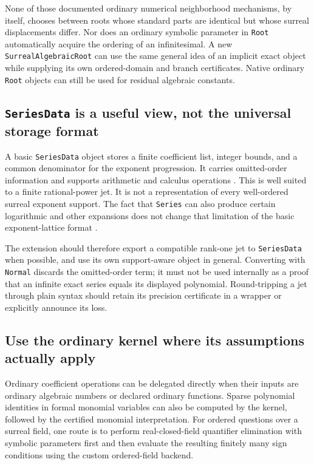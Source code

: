 \documentclass[11pt,letterpaper]{article}
\numberwithin{equation}{section}
\theoremstyle{definition}
\theoremstyle{remark}\newtheorem{remark}[theorem]{Remark}
\begin{document}
None of those documented ordinary numerical neighborhood mechanisms, by
itself, chooses between roots whose standard parts are identical but whose
surreal displacements differ. Nor does an ordinary symbolic parameter in
\texttt{Root} automatically acquire the ordering of an infinitesimal.
A new \texttt{SurrealAlgebraicRoot} can use the same general idea of an
implicit exact object while supplying its own ordered-domain and branch
certificates. Native ordinary \texttt{Root} objects can still be used for
residual algebraic constants.

\subsection{\texttt{SeriesData} is a useful view, not the universal storage format}
A basic \texttt{SeriesData} object stores a finite coefficient list, integer
bounds, and a common denominator for the exponent progression. It carries
omitted-order information and supports arithmetic and calculus operations
\cite{WLSeriesData}. This is well suited to a finite rational-power jet.
It is not a representation of every well-ordered surreal exponent support.
The fact that \texttt{Series} can also produce certain logarithmic and other
expansions does not change that limitation of the basic exponent-lattice
format \cite{WLSeries}.

The extension should therefore export a compatible rank-one jet to
\texttt{SeriesData} when possible, and use its own support-aware object in
general. Converting with \texttt{Normal} discards the omitted-order term; it
must not be used internally as a proof that an infinite exact series equals
its displayed polynomial. Round-tripping a jet through plain syntax should
retain its precision certificate in a wrapper or explicitly announce its loss.

\subsection{Use the ordinary kernel where its assumptions actually apply}
Ordinary coefficient operations can be delegated directly when their inputs
are ordinary algebraic numbers or declared ordinary functions. Sparse
polynomial identities in formal monomial variables can also be computed by
the kernel, followed by the certified monomial interpretation. For ordered
questions over a surreal field, one route is to perform real-closed-field
quantifier elimination with symbolic parameters first and then evaluate the
resulting finitely many sign conditions using the custom ordered-field backend.
\end{document}
